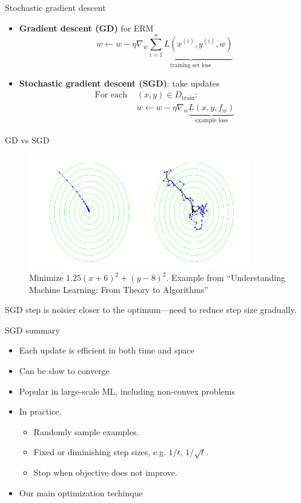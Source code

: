\documentclass[usenames,dvipsnames,notes,11pt,aspectratio=169]{beamer}
\begin{document}
\begin{frame}
    {Stochastic gradient descent}
    \begin{itemize}
        \item \textbf{Gradient descent (GD)} for ERM
            $$
            w \leftarrow w - \eta\nabla_w \underbrace{\sum_{i=1}^n L(x^{(i)}, y^{(i)}, w)}_{\textstyle{\text{training set loss}}}
            $$
            \pause
        \item \textbf{Stochastic gradient descent (SGD)}: take  updates\\
            \begin{align*}
                \text{For each } &(x, y) \in D_{\text{train}}:\\
                &w \leftarrow w - \eta\nabla_w \underbrace{L(x, y, f_w)}_{\textstyle{\text{example loss}}}
            \end{align*}
    \end{itemize}
\end{frame}

\begin{frame}
    {GD vs SGD}
    \begin{figure}
        \caption{Minimize $1.25(x + 6)^2 + (y - 8)^2$. Example from ``Understanding Machine Learning: From Theory to Algorithms''}
        \includegraphics[height=5cm]{figures/gd-vs-sgd}
    \end{figure}
    SGD step is noisier closer to the optimum---need to reduce step size gradually.
\end{frame}

\begin{frame}
    {SGD summary}
    \begin{itemize}
        \itemsep1em
        \item Each update is efficient in both time and space
        \item Can be slow to converge 
        \item Popular in large-scale ML, including non-convex problems
        \item In practice, 
            \begin{itemize}
                \item Randomly sample examples.
                \item Fixed or diminishing step sizes, e.g. $1/t$, $1/\sqrt{t}$.
                \item Stop when objective does not improve.
            \end{itemize}
        \item Our main optimization techinque
    \end{itemize}
\end{frame}
\end{document}
